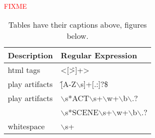 \textcolor{red}{FIXME}
\begin{table}[H]%
  \caption{Tables have their captions above, figures below.}
  \label{table-with-numbers}%
  \centering\small
  \begin{tabular}{@{}ll@{}} %
    \toprule
    \textbf{Description} & \textbf{Regular Expression}  \\
    \midrule
            html tags            & <[\^>]+> \\
            play artifacts       & \^[A-Z$\backslash$s]+[.:]?\$ \\
             play artifacts & $\backslash$s*ACT$\backslash$s+$\backslash$w+$\backslash$b$\backslash$.? \\
& $\backslash$s*SCENE$\backslash$s+$\backslash$w+$\backslash$b$\backslash$.? \\
whitespace           & $\backslash$s+ \\


    \bottomrule
  \end{tabular}
\end{table}












